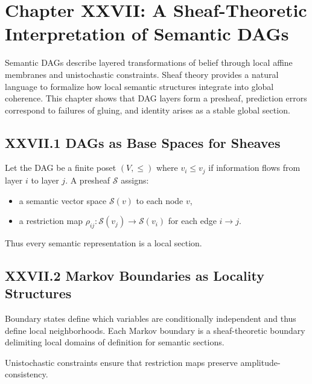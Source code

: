 \documentclass[11pt,letterpaper]{article}
\begin{document}
\newpage

\section{Chapter XXVII: A Sheaf-Theoretic Interpretation of Semantic DAGs}

Semantic DAGs describe layered transformations of belief through local affine membranes and unistochastic constraints. Sheaf theory provides a natural language to formalize how local semantic structures integrate into global coherence. This chapter shows that DAG layers form a presheaf, prediction errors correspond to failures of gluing, and identity arises as a stable global section.

\subsection{XXVII.1 DAGs as Base Spaces for Sheaves}

Let the DAG be a finite poset $(V,\le)$ where $v_i \le v_j$ if information flows from layer $i$ to layer $j$. A presheaf $\mathcal{S}$ assigns:

\begin{itemize}
    \item a semantic vector space $\mathcal{S}(v)$ to each node $v$,
    \item a restriction map $\rho_{ij} : \mathcal{S}(v_j)\to\mathcal{S}(v_i)$ for each edge $i\to j$.
\end{itemize}

Thus every semantic representation is a local section.

\subsection{XXVII.2 Markov Boundaries as Locality Structures}

Boundary states define which variables are conditionally independent and thus define local neighborhoods. Each Markov boundary is a sheaf-theoretic boundary delimiting local domains of definition for semantic sections.

Unistochastic constraints ensure that restriction maps preserve amplitude-consistency.
\end{document}
